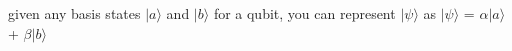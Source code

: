 \documentclass[preview]{standalone}
\begin{document}
\begin{center}
given any basis states $|a\rangle$ and $|b\rangle$ for a qubit, you can represent $|\psi\rangle$ as $|\psi\rangle$ = $\alpha$$|a\rangle$ + $\beta$$|b\rangle$
\end{center}
\end{document}
